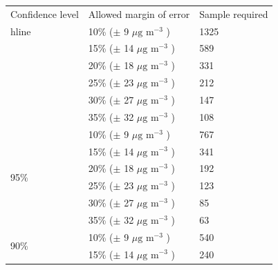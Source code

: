 \begin{table}[H]
\centering
\begin{tabular}{|l|l|l|}
\hline
Confidence level     &            Allowed margin of error                            &        Sample required       \\ hline
\multirow{6}{*}{99\%}   &            10\% ($\pm$ 9   $\mu \text{g m}^{-3}$ )    &        1325                  \\ \cline{2-3} 
                        &            15\% ($\pm$ 14  $\mu \text{g m}^{-3}$ )    &        589                   \\ \cline{2-3} 
                        &            20\% ($\pm$ 18  $\mu \text{g m}^{-3}$ )    &        331                   \\ \cline{2-3}
                        &            25\% ($\pm$ 23  $\mu \text{g m}^{-3}$ )    &        212                   \\ \cline{2-3}
                        &            30\% ($\pm$ 27  $\mu \text{g m}^{-3}$ )    &        147                   \\ \cline{2-3}
                        &            35\% ($\pm$ 32  $\mu \text{g m}^{-3}$ )    &        108                   \\ \hline
\multirow{6}{*}{95\%}   &            10\% ($\pm$ 9   $\mu \text{g m}^{-3}$ )    &        767                   \\ \cline{2-3} 
                        &            15\% ($\pm$ 14  $\mu \text{g m}^{-3}$ )    &        341                   \\ \cline{2-3} 
                        &            20\% ($\pm$ 18  $\mu \text{g m}^{-3}$ )    &        192                   \\ \cline{2-3} 
                        &            25\% ($\pm$ 23  $\mu \text{g m}^{-3}$ )    &        123                   \\ \cline{2-3} 
                        &            30\% ($\pm$ 27  $\mu \text{g m}^{-3}$ )    &        85                    \\ \cline{2-3} 
                        &            35\% ($\pm$ 32  $\mu \text{g m}^{-3}$ )    &        63                    \\ \hline
\multirow{6}{*}{90\%}   &            10\% ($\pm$ 9   $\mu \text{g m}^{-3}$ )    &        540                   \\ \cline{2-3} 
                        &            15\% ($\pm$ 14  $\mu \text{g m}^{-3}$ )    &        240                   \\ \cline{2-3} 

\end{tabular}
\end{table}
